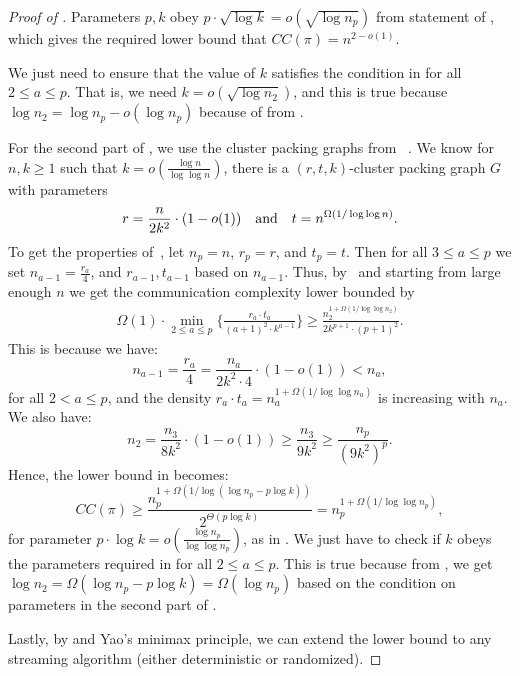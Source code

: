\documentclass[11pt]{article}
\theoremstyle{definition}
\renewcommand{\leq}{\leqslant}
\renewcommand{\geq}{\geqslant}
\newcommand{\prot}{\ensuremath{\pi}}
\begin{document}
\begin{proof}[Proof of ]
	Parameters $p, k$ obey $p \cdot \sqrt{\log k} = o(\sqrt{\log n_p})$ from statement of , which gives the required lower bound that $CC(\prot) = n^{2-o(1)}$. 
	
	We just need to ensure that the value of $k$ satisfies the condition in  for all $2 \leq a \leq p$. That is, we  need $k = o(\sqrt{\log n_2})$, and this is true because $\log n_2  = \log n_p - o(\log n_p)$ because of from .
	


		For the second part of , we use the cluster packing graphs from ~.  We know for $n, k\geq 1$ such that $k=o(\frac{\log n}{\log \log n})$, there is a $(r, t, k)$-cluster packing graph $G$ with parameters 
		\[
		r=\frac{n}{2k^2}\cdot (1-o(1)) \quad \textnormal{and} \quad t = n^{\Omega(1/\log\log{n})}. 
		\]
		To get the properties of~, let $n_p=n$, $r_p=r$, and $t_p=t$.
		Then for all $3\leq a \leq p$ we set
		$n_{a-1} = \frac{r_a}{4}$, and $r_{a-1}, t_{a-1}$ based on $n_{a-1}$. 
		Thus, by~ and starting from large enough $n$ we get the communication complexity lower bounded by
		\begin{align}
			\Omega(1)\cdot \min_{2 \leq a\leq p} \{\frac{r_a\cdot t_a}{(a+1)^2\cdot k^{a-1}}\}
			\geq \frac{n_2^{1+{\Omega(1/\log \log n_2)}}}{2k^{p+1} \cdot (p+1)^2}.\label{eq:interim-6}
		\end{align}
		This is because we have:
		\[
	n_{a-1} = \frac{r_a}{4} = \frac{n_a}{2k^2 \cdot 4} \cdot (1-o(1)) < n_a, 		
		\]
		for all $2 < a \leq p$, and the density $r_a \cdot t_a = n_a^{1+\Omega(1/\log \log n_a)}$ is increasing with $n_a$. 
		We also have:
		\begin{equation}\label{eq:interim-7}
			n_2 = \frac{n_3}{8k^2} \cdot (1-o(1)) \geq \frac{n_3}{9k^2} \geq \frac{n_p}{(9k^2)^p}.
		\end{equation}
		Hence, the lower bound in  becomes:
		\[
			CC(\prot) \geq \frac{n_p^{1+\Omega(1/\log (\log n_p - p \log k))}}{2^{\Theta(p \log k )}} = n_p^{1+\Omega(1/\log \log n_p)},
		\]
		for parameter $p \cdot \log k = o(\frac{\log n_p}{\log \log n_p})$, as in . We just have to check if $k$ obeys the parameters required in  for all $2 \leq a \leq p$. This is true because from , we get $\log n_2 = \Omega(\log n_p - p \log k) = \Omega(\log n_p)$ based on the condition on parameters in the second part of . 
		
		Lastly, by  and Yao's minimax principle, we can extend the lower bound to any streaming algorithm (either deterministic or randomized).
	\end{proof}
	
\end{document}

